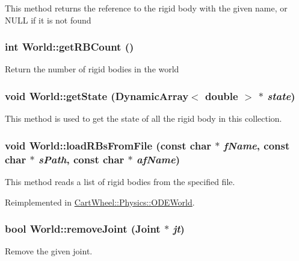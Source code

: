 This method returns the reference to the rigid body with the given name, or NULL if it is not found \hypertarget{classCartWheel_1_1Physics_1_1World_a8f439f879322e8305cd1e32f69ff1b4a}{
\subsubsection[{getRBCount}]{\setlength{\rightskip}{0pt plus 5cm}int World::getRBCount ()}}
\label{classCartWheel_1_1Physics_1_1World_a8f439f879322e8305cd1e32f69ff1b4a}
Return the number of rigid bodies in the world \hypertarget{classCartWheel_1_1Physics_1_1World_adc85d2be4988427c2c8da501c81ca7b0}{
\subsubsection[{getState}]{\setlength{\rightskip}{0pt plus 5cm}void World::getState (DynamicArray$<$ double $>$ $\ast$ {\em state})}}
\label{classCartWheel_1_1Physics_1_1World_adc85d2be4988427c2c8da501c81ca7b0}
This method is used to get the state of all the rigid body in this collection. \hypertarget{classCartWheel_1_1Physics_1_1World_a0602db984b22bbc3d13162a9ec07eb73}{
\subsubsection[{loadRBsFromFile}]{\setlength{\rightskip}{0pt plus 5cm}void World::loadRBsFromFile (const char $\ast$ {\em fName}, \/  const char $\ast$ {\em sPath}, \/  const char $\ast$ {\em afName})}}
\label{classCartWheel_1_1Physics_1_1World_a0602db984b22bbc3d13162a9ec07eb73}
This method reads a list of rigid bodies from the specified file. 

Reimplemented in \hyperlink{classCartWheel_1_1Physics_1_1ODEWorld_aecf3cd605875b12cdc25edd660ab3085}{CartWheel::Physics::ODEWorld}.

\hypertarget{classCartWheel_1_1Physics_1_1World_a5f13914f86bf8007f88b238111233ff6}{
\subsubsection[{removeJoint}]{\setlength{\rightskip}{0pt plus 5cm}bool World::removeJoint ({\bf Joint} $\ast$ {\em jt})}}
\label{classCartWheel_1_1Physics_1_1World_a5f13914f86bf8007f88b238111233ff6}
Remove the given joint. 

